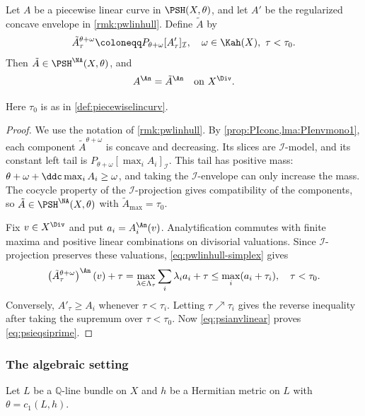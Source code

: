 \begin{lemma}\label{lma:psieqpsiprimeondiv}
Let $A$ be a piecewise linear curve in $\PSH(X,\theta)$, and let $A'$ be the regularized concave envelope in \cref{rmk:pwlinhull}. Define $\tilde A$ by
\[
    \tilde{A}^{\theta+\omega}_{\tau}\coloneqq P_{\theta+\omega}[A'_{\tau}]_{\mathcal I}, \quad \omega\in\Kah(X),\ \tau<\tau_0.
\]
Then $\tilde A\in\PSH^{\NA}(X,\theta)$, and
\begin{equation}\label{eq:psieqsiprime}
A^{\An}=\tilde{A}^{\An}\quad \text{on }X^{\Div}.
\end{equation}
\end{lemma}
Here $\tau_0$ is as in \cref{def:piecewiselincurv}.
\begin{proof}
We use the notation of \cref{rmk:pwlinhull}. By \cref{prop:PIconc,lma:PIenvmono1}, each component $\tilde A^{\theta+\omega}$ is concave and decreasing. Its slices are $\mathcal I$-model, and its constant left tail is $P_{\theta+\omega}[\max_i A_i]_{\mathcal I}$. This tail has positive mass: $\theta+\omega+\ddc\max_i A_i\geq\omega$, and taking the $\mathcal I$-envelope can only increase the mass. The cocycle property of the $\mathcal I$-projection gives compatibility of the components, so $\tilde A\in\PSH^{\NA}(X,\theta)$ with $\tilde A_{\max}=\tau_0$.

Fix $v\in X^{\Div}$ and put $a_i=A_i^{\An}(v)$. Analytification commutes with finite maxima and positive linear combinations on divisorial valuations. Since $\mathcal I$-projection preserves these valuations, \eqref{eq:pwlinhull-simplex} gives
\[
\left(\tilde A^{\theta+\omega}_{\tau}\right)^{\An}(v)+\tau
=\max_{\lambda\in\Lambda_{\tau}}\sum_i\lambda_i a_i+\tau
\leq\max_i(a_i+\tau_i),\quad \tau<\tau_0.
\]
Conversely, $A'_{\tau}\geq A_i$ whenever $\tau<\tau_i$. Letting $\tau\nearrow\tau_i$ gives the reverse inequality after taking the supremum over $\tau<\tau_0$. Now \eqref{eq:psianvlinear} proves \eqref{eq:psieqsiprime}.
\end{proof}




\subsubsection{The algebraic setting}
\label{subsubsec:analytic_alg}

Let $L$ be a $\mathbb{Q}$-line bundle on $X$ and $h$ be a Hermitian metric on $L$ with $\theta=c_1(L,h)$.



